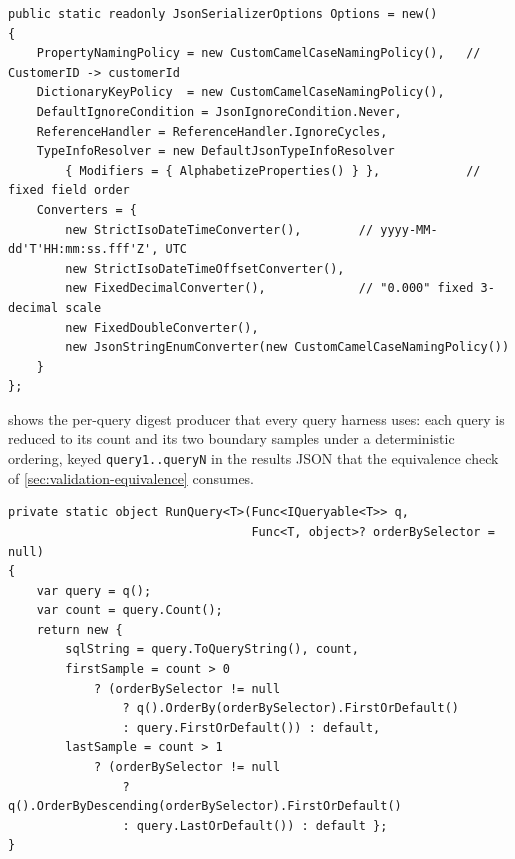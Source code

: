\begin{listing}[H]
\begin{verbatim}
public static readonly JsonSerializerOptions Options = new()
{
    PropertyNamingPolicy = new CustomCamelCaseNamingPolicy(),   // CustomerID -> customerId
    DictionaryKeyPolicy  = new CustomCamelCaseNamingPolicy(),
    DefaultIgnoreCondition = JsonIgnoreCondition.Never,
    ReferenceHandler = ReferenceHandler.IgnoreCycles,
    TypeInfoResolver = new DefaultJsonTypeInfoResolver
        { Modifiers = { AlphabetizeProperties() } },            // fixed field order
    Converters = {
        new StrictIsoDateTimeConverter(),        // yyyy-MM-dd'T'HH:mm:ss.fff'Z', UTC
        new StrictIsoDateTimeOffsetConverter(),
        new FixedDecimalConverter(),             // "0.000" fixed 3-decimal scale
        new FixedDoubleConverter(),
        new JsonStringEnumConverter(new CustomCamelCaseNamingPolicy())
    }
};
\end{verbatim}
\caption{The invariant .NET serializer configuration (from \texttt{EFCoreQueryEntrypoint.cs}); the Java prelude mirrors every rule in Jackson.}
\label{lst:app-serializer-cs}
\end{listing}

 shows the per-query digest producer that every query harness
uses: each query is reduced to its count and its two boundary samples under a
deterministic ordering, keyed \texttt{query1..queryN} in the results JSON that the
equivalence check of \cref{sec:validation-equivalence} consumes.

\begin{listing}[H]
\begin{verbatim}
private static object RunQuery<T>(Func<IQueryable<T>> q,
                                  Func<T, object>? orderBySelector = null)
{
    var query = q();
    var count = query.Count();
    return new {
        sqlString = query.ToQueryString(), count,
        firstSample = count > 0
            ? (orderBySelector != null
                ? q().OrderBy(orderBySelector).FirstOrDefault()
                : query.FirstOrDefault()) : default,
        lastSample = count > 1
            ? (orderBySelector != null
                ? q().OrderByDescending(orderBySelector).FirstOrDefault()
                : query.LastOrDefault()) : default };
}
\end{verbatim}
\caption{The count/boundary-sample digest producer of the EF Core query harness; each framework implements the same contract in its own idiom.}
\label{lst:app-runquery}
\end{listing}

